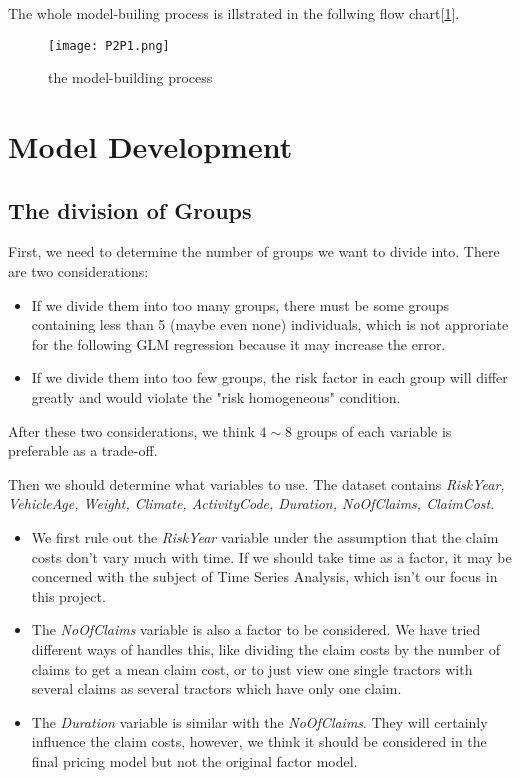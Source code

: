 \documentclass[11pt]{article}
\begin{document}
The whole model-builing process is illstrated in the follwing flow chart[\ref{Fig1}].


\begin{figure}[!htb]
\centering
\texttt{[image: P2P1.png]}
\caption{the model-building process}\label{Fig1}
\end{figure}

\section{Model Development}
\subsection{The division of Groups} 

First, we need to determine the number of groups we want to divide into. There are two considerations:

\begin{itemize}
	\item If we divide them into too many groups, there must be some groups containing less than 5 (maybe even none) individuals, which is not approriate for the following GLM regression because it may increase the error.
	\item If we divide them into too few groups, the risk factor in each group will differ greatly and would violate the "risk homogeneous" condition.
\end{itemize}


After these two considerations, we think $4\sim 8$  groups of each variable is preferable as a trade-off.\newline

Then we should determine what variables to use. The dataset contains {\it RiskYear, VehicleAge, Weight, Climate, ActivityCode, Duration, NoOfClaims, ClaimCost}.

\begin{itemize}
	\item We first rule out the {\it RiskYear}  variable under the assumption that the claim costs don't vary much with time. If we should take time as a factor, it may be concerned with the subject of Time Series Analysis, which isn't our focus in this project.
	\item The {\it NoOfClaims} variable is also a factor to be considered. We have tried different ways of handles this, like dividing the claim costs by the number of claims to get a mean claim cost, or to just view one single tractors with several claims as several tractors which have only one claim. 
	\item The {\it Duration} variable is similar with the {\it NoOfClaims}. They will certainly influence the claim costs, however, we think it should be considered in the final pricing model but not the original factor model.
\end{itemize}
\end{document}
